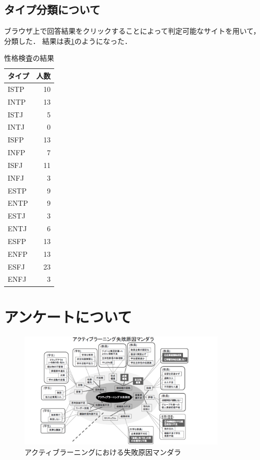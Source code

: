  \newpage


\subsection{タイプ分類について}
ブラウザ上で回答結果をクリックすることによって判定可能なサイトを用いて，分類した\cite{mbtib}．
結果は表\ref{MBTI結果}のようになった．
\begin{table}
  \caption{性格検査の結果}
  \label{MBTI結果}
  \centering
  \begin{tabular}{l|r}
タイプ & 人数 \\
  \hline
ISTP & 10 \\
INTP & 13 \\
ISTJ & 5 \\
INTJ & 0 \\
ISFP & 13 \\
INFP & 7 \\
ISFJ & 11 \\
INFJ & 3 \\
ESTP & 9 \\
ENTP & 9 \\
ESTJ	 & 3 \\
ENTJ	 & 6 \\
ESFP	 & 13 \\
ENFP	 & 13 \\
ESFJ	 & 23 \\
ENFJ	 & 3 \\
 \hline
  \end{tabular}
\end{table}
 \newpage

\section{アンケートについて}

\begin{figure}[htb]
\centering
\includegraphics[width=10cm]{sippaimandara.pdf}
\caption{アクティブラーニングにおける失敗原因マンダラ}\label{失敗曼荼羅}
\end{figure}

